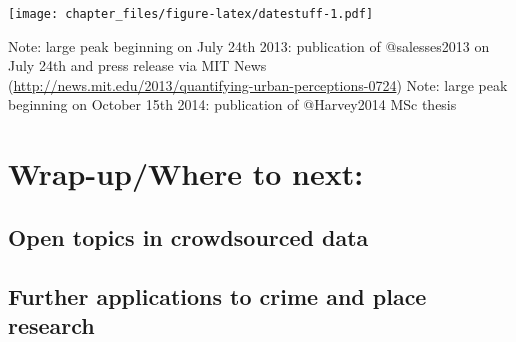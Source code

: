 \documentclass[
]{article}
\newenvironment{Shaded}{\begin{snugshade}}{\end{snugshade}}
\newcommand{\DataTypeTok}[1]{\textcolor[rgb]{0.13,0.29,0.53}{#1}}
\newcommand{\DecValTok}[1]{\textcolor[rgb]{0.00,0.00,0.81}{#1}}
\newcommand{\FloatTok}[1]{\textcolor[rgb]{0.00,0.00,0.81}{#1}}
\newcommand{\KeywordTok}[1]{\textcolor[rgb]{0.13,0.29,0.53}{\textbf{#1}}}
\newcommand{\NormalTok}[1]{#1}
\newcommand{\OperatorTok}[1]{\textcolor[rgb]{0.81,0.36,0.00}{\textbf{#1}}}
\newcommand{\StringTok}[1]{\textcolor[rgb]{0.31,0.60,0.02}{#1}}
\begin{document}
\begin{Shaded}
\end{Shaded}

\texttt{[image: chapter\_files/figure-latex/datestuff-1.pdf]}

Note: large peak beginning on July 24th 2013: publication of
@salesses2013 on July 24th and press release via MIT News
(\url{http://news.mit.edu/2013/quantifying-urban-perceptions-0724})
Note: large peak beginning on October 15th 2014: publication of
@Harvey2014 MSc thesis

\hypertarget{wrap-upwhere-to-next}{%
\section{Wrap-up/Where to next:}\label{wrap-upwhere-to-next}}

\hypertarget{open-topics-in-crowdsourced-data}{%
\subsection{Open topics in crowdsourced
data}\label{open-topics-in-crowdsourced-data}}

\hypertarget{further-applications-to-crime-and-place-research}{%
\subsection{Further applications to crime and place
research}\label{further-applications-to-crime-and-place-research}}
\end{document}
